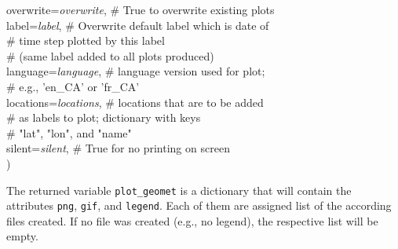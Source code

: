 \documentclass[10pt,a4paper,titlepage,parskip]{scrartcl}
\newenvironment{ttfont}{\fontfamily{\ttdefault}\selectfont}{\par}
\newcommand{\GRAU}[1]{\textcolor{ufzgray2}{#1}}
\begin{document}
\begin{framed}
\begin{ttfont}
\begin{tabbing}
			\> overwrite=\textit{overwrite}, \> \GRAU{\# True to overwrite existing plots}\\
			\> label=\textit{label}, \> \GRAU{\# Overwrite default label which is date of }\\
			\> \> \GRAU{\# time step plotted by this label }\\
			\> \> \GRAU{\# (same label added to all plots produced)}\\
			\> language=\textit{language}, \> \GRAU{\# language version used for plot;}\\
			\> \> \GRAU{\# e.g., 'en\_CA' or 'fr\_CA'}\\
			\> locations=\textit{locations}, \> \GRAU{\# locations that are to be added }\\
			\> \> \GRAU{\# as labels to plot; dictionary with keys }\\
			\> \> \GRAU{\# "lat", "lon", and "name"}\\
			\> silent=\textit{silent}, \> \GRAU{\# True for no printing on screen}\\
			\> ) \> 
		\end{tabbing}
	\end{ttfont}
	\vspace*{-0.3cm}
\end{framed}
\vspace*{-0.3cm}
The returned variable \texttt{plot\_geomet} is a dictionary that will contain the attributes \texttt{png}, \texttt{gif}, and \texttt{legend}. Each of them are assigned list of the according files created. If no file was created (e.g., no legend), the respective list will be empty.
\end{document}
